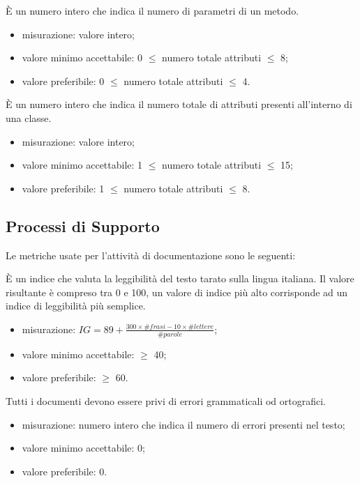 		È un numero intero che indica il numero di parametri di un metodo. 
		\begin{itemize}
			\item{misurazione: valore intero;}
			\item{valore minimo accettabile: 0 $\leq$ numero totale attributi $\leq$ 8;}
			\item{valore preferibile: 0 $\leq$ numero totale attributi $\leq$ 4.}
		\end{itemize}
			
		È un numero intero che indica il numero totale di attributi presenti all'interno di una classe.				\begin{itemize}
			\item{misurazione: valore intero;}
			\item{valore minimo accettabile: 1 $\leq$ numero totale attributi $\leq$ 15;}
			\item{valore preferibile: 1 $\leq$ numero totale attributi $\leq$ 8.}
		\end{itemize}

\subsection{Processi di Supporto}

	Le metriche usate per l'attività di documentazione sono le seguenti:
	
		È un indice che valuta la leggibilità del testo tarato sulla lingua italiana. Il valore risultante è compreso tra 0 e 100, un valore di indice più alto corrisponde ad un indice di leggibilità più semplice.
		 \begin{itemize}
			\item{misurazione: $ IG=89+\frac{300 \times \#frasi -10\times \#lettere}{\#parole} $;}
			\item{valore minimo accettabile: $\geq$ 40;}
			\item{valore preferibile: $\geq$ 60.}
		\end{itemize}

		Tutti i documenti devono essere privi di errori grammaticali od ortografici.
		\begin{itemize}
			\item{misurazione: numero intero che indica il numero di errori presenti nel testo;}
			\item{valore minimo accettabile: 0;}
			\item{valore preferibile: 0.}
		\end{itemize}
		
